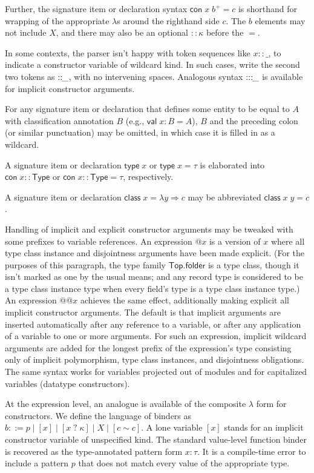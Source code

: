 \documentclass{article}
\newcommand{\mt}[1]{\mathsf{#1}}
\begin{document}
Further, the signature item or declaration syntax $\mt{con} \; x \; b^+ = c$ is shorthand for wrapping of the appropriate $\lambda$s around the righthand side $c$.  The $b$ elements may not include $X$, and there may also be an optional $:: \kappa$ before the $=$.

In some contexts, the parser isn't happy with token sequences like $x :: \_$, to indicate a constructor variable of wildcard kind.  In such cases, write the second two tokens as $::\hspace{-.05in}\_$, with no intervening spaces.  Analogous syntax $:::\hspace{-.05in}\_$ is available for implicit constructor arguments.

For any signature item or declaration that defines some entity to be equal to $A$ with classification annotation $B$ (e.g., $\mt{val} \; x : B = A$), $B$ and the preceding colon (or similar punctuation) may be omitted, in which case it is filled in as a wildcard.

A signature item or declaration $\mt{type} \; x$ or $\mt{type} \; x = \tau$ is elaborated into $\mt{con} \; x :: \mt{Type}$ or $\mt{con} \; x :: \mt{Type} = \tau$, respectively.

A signature item or declaration $\mt{class} \; x = \lambda y \Rightarrow c$ may be abbreviated $\mt{class} \; x \; y = c$.

Handling of implicit and explicit constructor arguments may be tweaked with some prefixes to variable references.  An expression $@x$ is a version of $x$ where all type class instance and disjointness arguments have been made explicit.  (For the purposes of this paragraph, the type family $\mt{Top.folder}$ is a type class, though it isn't marked as one by the usual means; and any record type is considered to be a type class instance type when every field's type is a type class instance type.)  An expression $@@x$ achieves the same effect, additionally making explicit all implicit constructor arguments.  The default is that implicit arguments are inserted automatically after any reference to a variable, or after any application of a variable to one or more arguments.  For such an expression, implicit wildcard arguments are added for the longest prefix of the expression's type consisting only of implicit polymorphism, type class instances, and disjointness obligations.  The same syntax works for variables projected out of modules and for capitalized variables (datatype constructors).

At the expression level, an analogue is available of the composite $\lambda$ form for constructors.  We define the language of binders as $b ::= p \mid [x] \mid [x \; ? \; \kappa] \mid X \mid [c \sim c]$.  A lone variable $[x]$ stands for an implicit constructor variable of unspecified kind.  The standard value-level function binder is recovered as the type-annotated pattern form $x : \tau$.  It is a compile-time error to include a pattern $p$ that does not match every value of the appropriate type.
\end{document}
